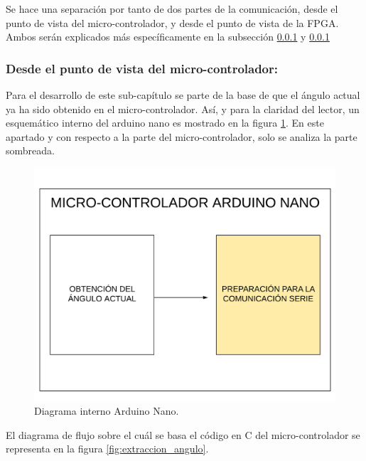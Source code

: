 Se hace una separación por tanto de dos partes de la comunicación, desde el punto de vista del micro-controlador, y desde el punto de vista de la FPGA. Ambos serán explicados más específicamente en la subsección \ref{sec:vista_controlador} y \ref{sec:vista_controlador}

\subsubsection{Desde el punto de vista del micro-controlador:}  \label{sec:vista_controlador}

Para el desarrollo de este sub-capítulo se parte de la base de que el ángulo actual ya ha sido obtenido en el micro-controlador. Así, y para la claridad del lector, un esquemático interno del arduino nano es mostrado en la figura \ref{fig:coexistencia3}. En este apartado y con respecto a la parte del micro-controlador, solo se analiza la parte sombreada.  

\begin{figure}[H]
	\center
	\includegraphics[trim = 0mm 0mm 0mm 0mm, clip,scale=0.3]{imagenes/Balancing_robot/coexistencia3.pdf}
	\caption{Diagrama interno Arduino Nano.}
	\label{fig:coexistencia3}
\end{figure}

El diagrama de flujo sobre el cuál se basa el código en C del micro-controlador se representa en la figura \ref{fig:extraccion_angulo}.


